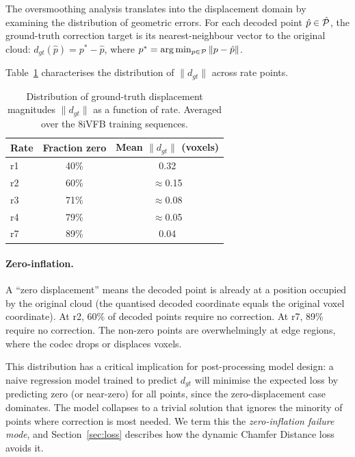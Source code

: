 The oversmoothing analysis translates into the displacement domain by
examining the distribution of geometric errors.
For each decoded point $\hat{p} \in \hat{\mathcal{P}}$, the ground-truth correction
target is its nearest-neighbour vector to the original cloud:
$d_{gt}(\hat{p}) = p^* - \hat{p}$, where $p^* = \arg\min_{p \in \mathcal{P}} \|p - \hat{p}\|$.

Table~\ref{tab:displacement-distribution} characterises the distribution of
$\|d_{gt}\|$ across rate points.

\begin{table}[t]
  \centering
  \caption{%
    Distribution of ground-truth displacement magnitudes $\|d_{gt}\|$
    as a function of rate.
    Averaged over the 8iVFB training sequences.
  }
  \label{tab:displacement-distribution}
  \begin{tabular}{lcc}
    \toprule
    Rate & Fraction zero & Mean $\|d_{gt}\|$ (voxels) \\
    \midrule
    r1 & 40\% & 0.32 \\
    r2 & 60\% & $\approx$0.15 \\
    r3 & 71\% & $\approx$0.08 \\
    r4 & 79\% & $\approx$0.05 \\
    r7 & 89\% & 0.04 \\
    \bottomrule
  \end{tabular}
\end{table}

\paragraph{Zero-inflation.}
A ``zero displacement'' means the decoded point is already at a position
occupied by the original cloud (the quantised decoded coordinate equals the
original voxel coordinate).
At r2, 60\% of decoded points require no correction.
At r7, 89\% require no correction.
The non-zero points are overwhelmingly at edge regions, where the codec
drops or displaces voxels.

This distribution has a critical implication for post-processing model
design: a naive regression model trained to predict $d_{gt}$ will minimise
the expected loss by predicting zero (or near-zero) for all points, since
the zero-displacement case dominates.
The model collapses to a trivial solution that ignores the minority of
points where correction is most needed.
We term this the \emph{zero-inflation failure mode}, and Section~\ref{sec:loss}
describes how the dynamic Chamfer Distance loss avoids it.

